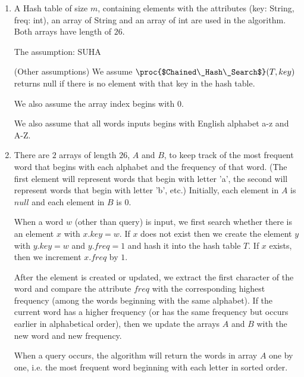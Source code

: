 \documentclass[11pt, answers]{exam}
\theoremstyle{plain}
\theoremstyle{definition}
\begin{document}
\begin{questions}
\begin{solution}
\begin{parts}
\end{parts}
\end{solution}


\question
\begin{solution}
\begin{enumerate}
\item A Hash table of size $m$, containing elements with the attributes (key: String, freq: int), an array of String and an array of int are used in the algorithm. Both arrays have length of $26$.

The assumption: SUHA

(Other assumptions)
We assume $\proc{$Chained\_Hash\_Search$}(T, key)$ returns null if there is no element with that key in the hash table.

We also assume the array index begins with 0.

We also assume that all words inputs begins with English alphabet a-z and A-Z.

\item There are $2$ arrays of length $26$, $A$ and $B$, to keep track of the most frequent word that begins with each alphabet and the frequency of that word. (The first element will represent words that begin with letter 'a', the second will represent words that begin with letter 'b', etc.) Initially, each element in $A$ is $null$ and each element in $B$ is $0$. 

When a word $w$ (other than query) is input, we first search whether there is an element $x$ with $x.key=w$. If $x$ does not exist then we create the element $y$ with $y.key=w$ and $y.freq=1$ and hash it into the hash table $T$. If $x$ exists, then we increment $x.freq$ by $1$.

After the element is created or updated, we extract the first character of the word and compare the attribute $freq$ with the corresponding highest frequency (among the words beginning with the same alphabet). If the current word has a higher frequency (or has the same frequency but occurs earlier in alphabetical order), then we update the arrays $A$ and $B$ with the new word and new frequency. 

When a query occurs, the algorithm will return the words in array $A$ one by one, i.e. the most frequent word beginning with each letter in sorted order.


\end{enumerate}
\end{solution}
\end{questions}
\end{document}
